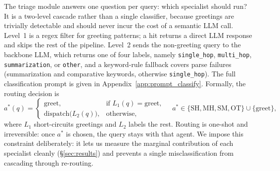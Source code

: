 \documentclass[11pt,a4paper]{article}
\begin{document}
The triage module answers one question per query: which specialist should run?
It is a two-level cascade rather than a single classifier, because greetings are trivially detectable and should never incur the cost of a semantic LLM call.
Level~1 is a regex filter for greeting patterns; a hit returns a direct LLM response and skips the rest of the pipeline.
Level~2 sends the non-greeting query to the backbone LLM, which returns one of four labels, namely \texttt{single\_hop}, \texttt{multi\_hop}, \texttt{summarization}, or \texttt{other}, and a keyword-rule fallback covers parse failures (summarization and comparative keywords, otherwise \texttt{single\_hop}).
The full classification prompt is given in Appendix~\ref{app:prompt_classify}.
Formally, the routing decision is
\begin{equation}
a^{*}(q)=
\begin{cases}
\text{greet}, & \text{if } L_{1}(q)=\text{greet},\\[2pt]
\mathrm{dispatch}\!\bigl(L_{2}(q)\bigr), & \text{otherwise},
\end{cases}
\quad a^{*}\in\{\text{SH},\text{MH},\text{SM},\text{OT}\}\cup\{\text{greet}\},
\label{eq:route}
\end{equation}
where $L_{1}$ short-circuits greetings and $L_{2}$ labels the rest.
Routing is one-shot and irreversible: once $a^{*}$ is chosen, the query stays with that agent.
We impose this constraint deliberately: it lets us measure the marginal contribution of each specialist cleanly (\S\ref{sec:results}) and prevents a single misclassification from cascading through re-routing.
\end{document}
